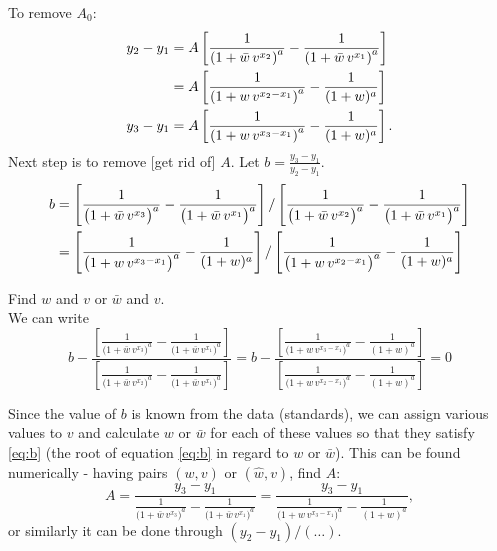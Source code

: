 \documentclass[12pt]{article}
\theoremstyle{remark}
\begin{document}
To remove $A_0$:
\begin{align}
  y_2 - y_1 &= A \left[ \frac{1}{\left( 1 + \bar{w} \, v^{x_2}
  \right)^a} - \frac{1}{\left( 1 + \bar{w} \, v^{x_1} \right)^a} \right]
                      \notag \\
  &= A \left[ \frac{1}{\left(1 + w \, v^{x_2 - x_1} \right)^a}
    - \frac{1}{(1 + w)^a} \right] \notag \\
  y_3 - y_1 &= A \left[ \frac{1}{\left(1 + w \, v^{x_3 - x_1} \right)^a}
    - \frac{1}{(1 + w)^a} \right].  
\end{align}
Next step is to remove [get rid of] $A$. Let $b = \frac{y_3 -
  y_1}{y_2 - y_1}$.
\begin{align}
  b &= \left[ \frac{1}{\big(1 + \bar{w} \, v^{x_3} \big)^a} -
                 \frac{1}{\big(1 + \bar{w} \, v^{x_1} \big)^a}
  \right] / 
          \left[ \frac{1}{\big(1 + \bar{w} \, v^{x_2} \big)^a} -
                   \frac{1}{\big(1 + \bar{w} \, v^{x_1} \big)^a}
      \right] \notag \\
    &= \left[ \frac{1}{\big(1 + w \, v^{x_3 - x_1} \big)^a} -
                 \frac{1}{(1 + w)^a} \right] / 
          \left[ \frac{1}{\big(1 + w \, v^{x_2 - x_1} \big)^a} -
                   \frac{1}{(1 + w)^a} \right] 
\end{align}

Find $w$ and $v$ or $\bar{w}$ and $v$. \\

We can write 
\begin{equation} \label{eq:b}
  b - \frac{\left[ \frac{1}{\big(1 + \bar{w} \, v^{x_3} \big)^a} -
                 \frac{1}{\big(1 + \bar{w} \, v^{x_1} \big)^a}
  \right]} 
          {\left[ \frac{1}{\big(1 + \bar{w} \, v^{x_2} \big)^a} -
                   \frac{1}{\big(1 + \bar{w} \, v^{x_1} \big)^a}
      \right]}
    = b - \frac{\left[ \frac{1}{\big(1 + w \, v^{x_3 - x_1} \big)^a} -
                 \frac{1}{(1 + w)^a} \right]} 
          {\left[ \frac{1}{\big(1 + w \, v^{x_2 - x_1} \big)^a} -
                   \frac{1}{(1 + w)^a} \right]} = 0
\end{equation}
             
Since the value of $b$ is known from the data (standards), we can
assign various values to $v$ and calculate $w$ or $\bar{w}$ for each
of these values so that they satisfy \eqref{eq:b} (the root of
equation \eqref{eq:b} in regard to $w$ or $\bar{w}$). This can be
found numerically - having pairs $(w, v)$ or $(\hat{w}, v)$, find $A$:
\begin{equation}
  A = \frac{y_3 - y_1}{\frac{1}{\big(1 + \bar{w} \, v^{x_3} \big)^a} -
    \frac{1}{\big(1 + \bar{w} \, v^{x_1} \big)^a}}
     = \frac{y_3 - y_1}{\frac{1}{\big(1 + w \, v^{x_3 - x_1} \big)^a} -
                 \frac{1}{(1 + w)^a}},
\end{equation}
or similarly it can be done through $(y_2 - y_1) / (\dotsc)$. \\
\end{document}
